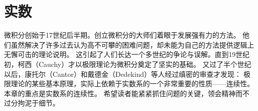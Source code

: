 \documentclass[12pt,a4paper,oneside]{ctexbook}
\begin{document}
\else%
\fi


\chapter{实数}

微积分创始于17世纪后半期。创立微积分的大师们着眼于发展强有力的方法。
他们虽然解决了许多过去认为高不可攀的困难问题，却未能为自己的方法提供逻辑上无懈可击的理论说明。
这引起了人们长达一个多世纪的争论与误解。直到19世纪初，柯西（Cauchy）才以极限理论为微积分奠定了坚实的基础。
又过了半个世纪以后，康托尔（Cantor）和戴德金（Dedekind）等人经过缜密的审查才发现：
极限理论的某些基本原理，实际上依赖于实数系的一个非常重要的性质——连续性。
本章的重点是实数系的连续性。
希望读者能紧紧抓住问题的关键，领会精神而不过分拘泥于细节。

\ifx\allfiles\undefined %
\end{document}
